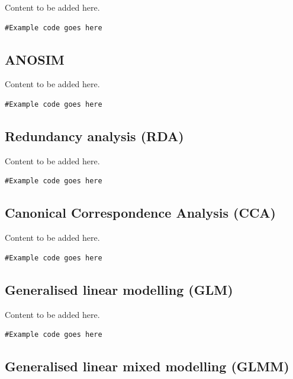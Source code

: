 \documentclass[
]{book}
\begin{document}
Content to be added here.

\begin{verbatim}
#Example code goes here
\end{verbatim}

\hypertarget{anosim}{%
\subsection{ANOSIM}\label{anosim}}

Content to be added here.

\begin{verbatim}
#Example code goes here
\end{verbatim}

\hypertarget{redundancy-analysis}{%
\subsection{Redundancy analysis (RDA)}\label{redundancy-analysis}}

Content to be added here.

\begin{verbatim}
#Example code goes here
\end{verbatim}

\hypertarget{canonical-correspondence-analysis}{%
\subsection{Canonical Correspondence Analysis (CCA)}\label{canonical-correspondence-analysis}}

Content to be added here.

\begin{verbatim}
#Example code goes here
\end{verbatim}

\hypertarget{generalised-linear-modelling}{%
\subsection{Generalised linear modelling (GLM)}\label{generalised-linear-modelling}}

Content to be added here.

\begin{verbatim}
#Example code goes here
\end{verbatim}

\hypertarget{generalised-linear-mixed-modelling}{%
\subsection{Generalised linear mixed modelling (GLMM)}\label{generalised-linear-mixed-modelling}}
\end{document}
